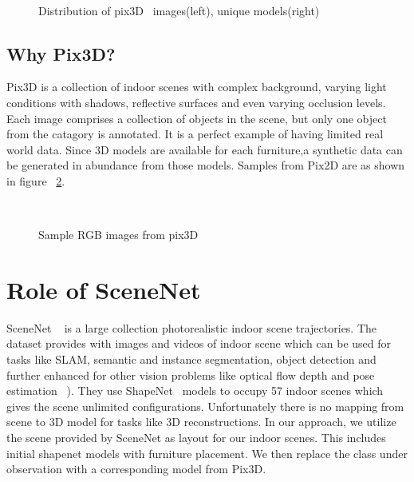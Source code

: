 \begin{figure}[!ht]
    \centering
    \quad
    \\
    \caption{Distribution of pix3D~\cite{pix3d} images(left), unique models(right)}
    \label{fig:pix3d_histogram}
\end{figure}

\subsection{Why Pix3D?}\label{subsec:why-pix3d?}
Pix3D is a collection of indoor scenes with complex background, varying light conditions with shadows, reflective surfaces and even varying occlusion levels.
Each image comprises a collection of objects in the scene, but only one object from the catagory is annotated.
It is a perfect example of having limited real world data.
Since 3D models are available for each furniture,a synthetic data can be generated in abundance from those models.
Samples from Pix2D are as shown in figure ~\ref{fig:Pix3D samples}.

\begin{figure}[!ht]
    \centering
    \quad
    \\
    \quad
    \caption{Sample RGB images from pix3D}
    \label{fig:Pix3D samples}
\end{figure}

\section{Role of SceneNet}\label{sec:role-of-scenenet}
SceneNet ~\cite{McCormac:etal:ICCV2017} is a large collection photorealistic indoor scene trajectories.
The dataset provides with images and videos of indoor scene which can be used for tasks like SLAM, semantic and instance segmentation,
object detection and further enhanced for other vision problems like optical flow depth and pose estimation ~\cite{McCormac:etal:ICCV2017}).
They use ShapeNet~\cite{chang2015shapenet} models to occupy 57 indoor scenes which gives the scene unlimited configurations.
Unfortunately there is no mapping from scene to 3D model for tasks like 3D reconstructions.
In our approach, we utilize the scene provided by SceneNet as layout for our indoor scenes.
This includes initial shapenet models with furniture placement.
We then replace the class under observation with a corresponding model from Pix3D.

